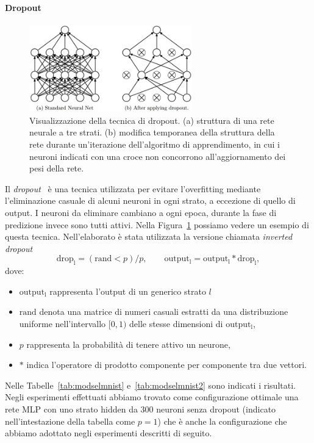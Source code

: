 \documentclass[11pt,a4paper,twoside,
openright]{book}
\begin{document}
\paragraph*{Dropout}
\begin{figure}
\begin{center}
\includegraphics[width=200pt]{dropout.jpeg}
\caption{Visualizzazione della tecnica di dropout. (a) struttura di una rete neurale a tre strati. (b) modifica temporanea della struttura della rete durante un'iterazione dell'algoritmo di apprendimento, in cui i neuroni indicati con una croce non concorrono all'aggiornamento dei pesi della rete.~\cite{10.5555/2627435.2670313}} \label{fig:dropout}
\end{center}
\end{figure}
Il \textit{dropout}~\cite{10.5555/2627435.2670313} è una tecnica utilizzata per evitare l'overfitting mediante l'eliminazione casuale di alcuni neuroni in ogni strato, a eccezione di quello di output. I neuroni da eliminare cambiano a ogni epoca, durante la fase di predizione invece sono tutti attivi. Nella Figura~\ref{fig:dropout} possiamo vedere un esempio di questa tecnica.
Nell'elaborato è stata utilizzata la versione chiamata \textit{inverted dropout}
\begin{equation}
\mathrm{drop_l}=(\mathrm{rand} < p)/p,  \qquad
\mathrm{output_l}=\mathrm{output_l} * \mathrm{drop_l},
\label{drop}
\end{equation}
dove:
\begin{itemize}
\item $\mathrm{output_l}$ rappresenta l'output di un generico strato $l$
\item $\mathrm{rand}$ denota una matrice di numeri casuali estratti da una distribuzione uniforme nell'intervallo $[0,1)$ delle stesse dimensioni di $\mathrm{output_l}$,
\item $p$ rappresenta la probabilità di tenere attivo un neurone,
\item $*$ indica l'operatore di prodotto componente per componente tra due vettori.
\end{itemize} 
Nelle Tabelle~\ref{tab:modselmnist} e~\ref{tab:modselmnist2} sono indicati i risultati. Negli esperimenti effettuati abbiamo trovato come configurazione ottimale una rete MLP con uno strato hidden da 300 neuroni senza dropout (indicato nell'intestazione della tabella come $p=1$) che è anche la configurazione che abbiamo adottato negli esperimenti descritti di seguito.

\end{document}

